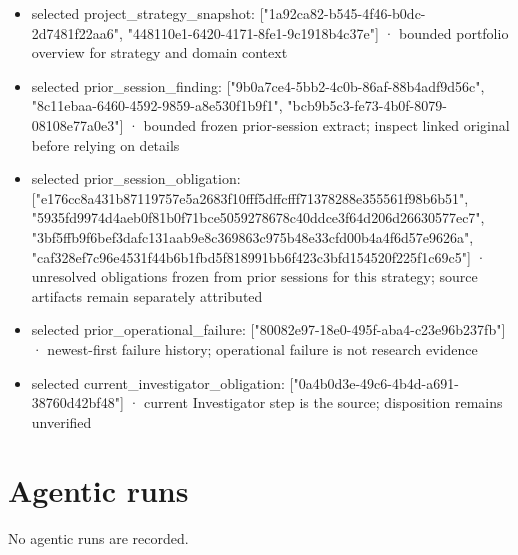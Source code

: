 \documentclass[11pt]{article}
\begin{document}
\begin{itemize}
\item selected project\_strategy\_snapshot: ["1a92ca82-b545-4f46-b0dc-2d7481f22aa6", "448110e1-6420-4171-8fe1-9c1918b4c37e"] · bounded portfolio overview for strategy and domain context
\item selected prior\_session\_finding: ["9b0a7ce4-5bb2-4c0b-86af-88b4adf9d56c", "8c11ebaa-6460-4592-9859-a8e530f1b9f1", "bcb9b5c3-fe73-4b0f-8079-08108e77a0e3"] · bounded frozen prior-session extract; inspect linked original before relying on details
\item selected prior\_session\_obligation: ["e176cc8a431b87119757e5a2683f10fff5dffcfff71378288e355561f98b6b51", "5935fd9974d4aeb0f81b0f71bce5059278678c40ddce3f64d206d26630577ec7", "3bf5ffb9f6bef3dafc131aab9e8c369863c975b48e33cfd00b4a4f6d57e9626a", "caf328ef7c96e4531f44b6b1fbd5f818991bb6f423c3bfd154520f225f1c69c5"] · unresolved obligations frozen from prior sessions for this strategy; source artifacts remain separately attributed
\item selected prior\_operational\_failure: ["80082e97-18e0-495f-aba4-c23e96b237fb"] · newest-first failure history; operational failure is not research evidence
\item selected current\_investigator\_obligation: ["0a4b0d3e-49c6-4b4d-a691-38760d42bf48"] · current Investigator step is the source; disposition remains unverified
\end{itemize}
\section{Agentic runs}
No agentic runs are recorded.\par
\end{document}

